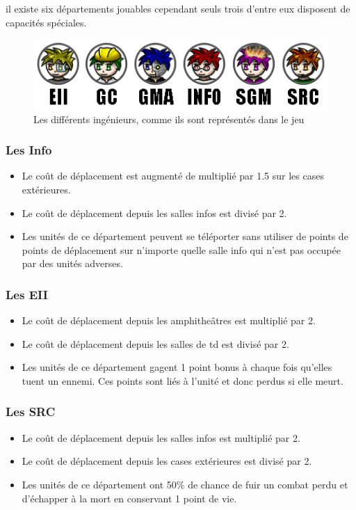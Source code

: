 il existe six départements jouables cependant seuls trois d'entre eux disposent de capacités spéciales. 

\begin{figure}[!h]
\centering
\includegraphics[width=.7\textwidth]{Parties/Images/Unites.png}
\caption{Les différents ingénieurs, comme ils sont représentés dans le jeu}
\label{fig:Unites}
\end{figure}

\subsubsection{Les Info}
\begin{itemize}
\item Le coût de déplacement est augmenté de multiplié par 1.5 sur les cases extérieures.
\item Le coût de déplacement depuis les salles infos est divisé par 2.
\item Les unités de ce département peuvent se téléporter sans utiliser de points de points de déplacement sur n'importe quelle salle info qui n'est pas occupée par des unités adverses.
\end{itemize}

\subsubsection{Les EII}
\begin{itemize}
\item Le coût de déplacement depuis les amphitheâtres est multiplié par 2.
\item Le coût de déplacement depuis les salles de td est divisé par 2.
\item Les unités de ce département gagent 1 point bonus à chaque fois qu'elles tuent un ennemi. Ces points sont liés à l'unité et donc perdus si elle meurt.
\end{itemize} 

\subsubsection{Les SRC}
\begin{itemize}
\item Le coût de déplacement depuis les salles infos est multiplié par 2.
\item Le coût de déplacement depuis les cases extérieures est divisé par 2.
\item Les unités de ce département ont 50\% de chance de fuir un combat perdu et d'échapper à la mort en conservant 1 point de vie. 
\end{itemize}

